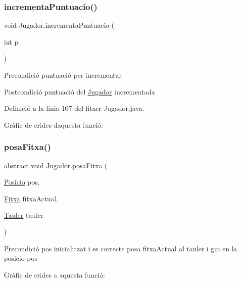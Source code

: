 \mbox{\label{class_jugador_a38bda447d8645686d11c49814dd31fe3}} 
\subsubsection{\texorpdfstring{incrementa\+Puntuacio()}{incrementaPuntuacio()}}
{\footnotesize\ttfamily void Jugador.\+incrementa\+Puntuacio (\begin{DoxyParamCaption}\item[{int}]{p }\end{DoxyParamCaption})}

\begin{DoxyPrecond}{Precondició}
puntuació per incrementar 
\end{DoxyPrecond}
\begin{DoxyPostcond}{Postcondició}
puntuació del \mbox{\hyperlink{class_jugador}{Jugador}} incrementada 
\end{DoxyPostcond}


Definició a la línia 107 del fitxer Jugador.\+java.

Gràfic de crides d\textquotesingle{}aquesta funció\+:
\mbox{\label{class_jugador_ae014826953f1629afbf0a19787aadfe0}} 
\subsubsection{\texorpdfstring{posa\+Fitxa()}{posaFitxa()}}
{\footnotesize\ttfamily abstract void Jugador.\+posa\+Fitxa (\begin{DoxyParamCaption}\item[{\mbox{\hyperlink{class_posicio}{Posicio}}}]{pos,  }\item[{\mbox{\hyperlink{class_fitxa}{Fitxa}}}]{fitxa\+Actual,  }\item[{\mbox{\hyperlink{class_tauler}{Tauler}}}]{tauler }\end{DoxyParamCaption})\hspace{0.3cm}{\ttfamily [abstract]}}

\begin{DoxyPrecond}{Precondició}
pos inicialitzat i es correcte  posa fitxa\+Actual al tauler i gui en la posicio pos 
\end{DoxyPrecond}
Gràfic de crides a aquesta funció\+:
\mbox{\label{class_jugador_a0fb22c0823337850e57c0efb5dd54aff}} 
